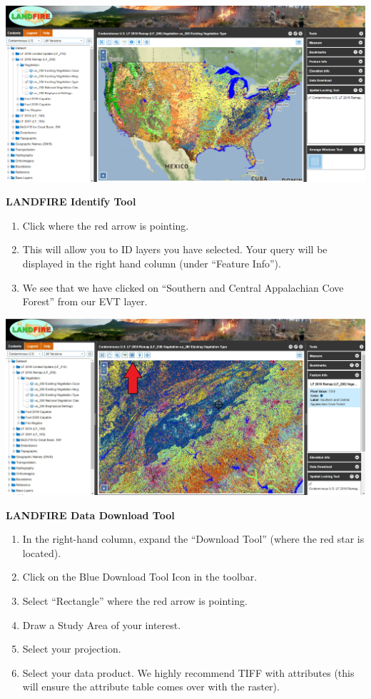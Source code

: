 \documentclass[
]{book}
\providecommand{\tightlist}{%
  \setlength{\itemsep}{0pt}\setlength{\parskip}{0pt}}
\begin{document}
\includegraphics[width=1000pt]{KP_screenshots/LANDFIRE First Load}

\textbf{LANDFIRE Identify Tool}

\begin{enumerate}
\def\labelenumi{\arabic{enumi}.}
\tightlist
\item
  Click where the red arrow is pointing.
\item
  This will allow you to ID layers you have selected. Your query will be displayed in the right hand column (under ``Feature Info'').
\item
  We see that we have clicked on ``Southern and Central Appalachian Cove Forest'' from our EVT layer.
\end{enumerate}

\includegraphics[width=1000pt]{KP_screenshots/LANDFIRE Identify}

\textbf{LANDFIRE Data Download Tool}

\begin{enumerate}
\def\labelenumi{\arabic{enumi}.}
\tightlist
\item
  In the right-hand column, expand the ``Download Tool'' (where the red star is located).
\item
  Click on the Blue Download Tool Icon in the toolbar.
\item
  Select ``Rectangle'' where the red arrow is pointing.
\item
  Draw a Study Area of your interest.
\item
  Select your projection.
\item
  Select your data product. We highly recommend TIFF with attributes (this will ensure the attribute table comes over with the raster).
\end{enumerate}
\end{document}
